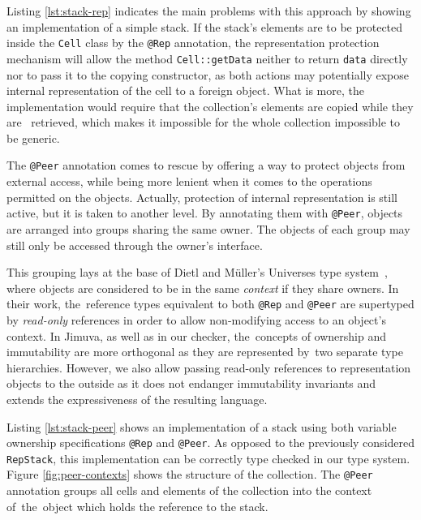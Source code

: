 \documentclass{pracamgr}
\theoremstyle{break}
\theoremstyle{break}
\theoremstyle{break}
\begin{document}


Listing \ref{lst:stack-rep} indicates the main problems with this
approach by showing an implementation of a simple stack. If the
stack's elements are to be protected inside the \texttt{Cell} class by
the \texttt{@Rep} annotation, the representation protection mechanism
will allow the method \texttt{Cell::getData} neither to return
\texttt{data} directly nor to pass it to the copying constructor, as
both actions may potentially expose internal representation of the
cell to a foreign object. What is more, the implementation would
require that the collection's elements are copied while they are~
retrieved, which makes it impossible for the whole collection
impossible to be generic.

The \texttt{@Peer} annotation comes to rescue by offering a way to
protect objects from external access, while being more lenient when it
comes to the operations permitted on the objects. Actually, protection
of internal representation is still active, but it is taken to another
level. By annotating them with \texttt{@Peer}, objects are arranged
into groups sharing the same owner. The objects of each group may
still only be accessed through the owner's interface.

This grouping lays at the base of Dietl and Müller's Universes type
system~\cite{universes}, where objects are considered to be in the
same \emph{context} if they share owners. In their work, the~reference
types equivalent to both \texttt{@Rep} and \texttt{@Peer} are
supertyped by \emph{read-only} references in order to allow
non-modifying access to an object's context. In Jimuva, as well as in
our checker, the~concepts of ownership and immutability are more
orthogonal as they are represented by~two separate type
hierarchies. However, we also allow passing read-only references to
representation objects to the outside as it does not endanger
immutability invariants and extends the expressiveness of the
resulting language.



Listing \ref{lst:stack-peer} shows an implementation of a stack using
both variable ownership specifications \texttt{@Rep} and
\texttt{@Peer}. As opposed to the previously considered
\texttt{RepStack}, this implementation can be correctly type checked
in our type system. Figure \ref{fig:peer-contexts} shows the structure
of the collection. The \texttt{@Peer} annotation groups all cells and
elements of the collection into the context of~the~object which holds
the reference to the stack.
\end{document}
